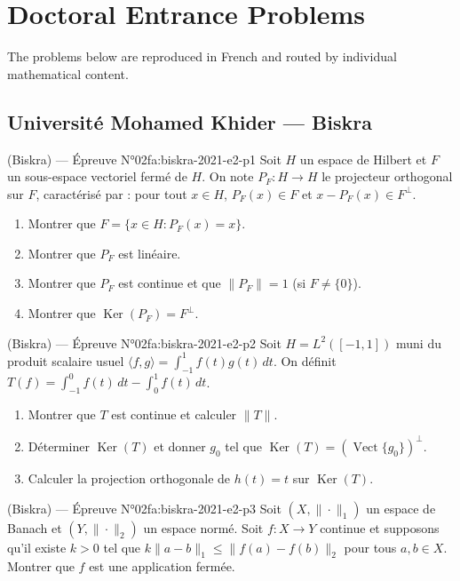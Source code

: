 \chapter{Doctoral Entrance Problems}
\label{ch:problems}

The problems below are reproduced in French and routed by individual mathematical content.
\newpage

\section{Université Mohamed Khider --- Biskra}
\begin{problem}{(Biskra) — Épreuve N°02}{fa:biskra-2021-e2-p1}
Soit $H$ un espace de Hilbert et $F$ un sous-espace vectoriel fermé de $H$. On note $P_F:H\to H$ le projecteur orthogonal sur $F$, caractérisé par : pour tout $x\in H$, $P_F(x)\in F$ et $x-P_F(x)\in F^\perp$.
\begin{enumerate}\item Montrer que $F=\{x\in H : P_F(x)=x\}$.\item Montrer que $P_F$ est linéaire.\item Montrer que $P_F$ est continue et que $\|P_F\|=1$ (si $F\neq\{0\}$).\item Montrer que $\operatorname{Ker}(P_F)=F^\perp$.\end{enumerate}
\end{problem}
\newpage
\begin{problem}{(Biskra) — Épreuve N°02}{fa:biskra-2021-e2-p2}
Soit $H=L^2([-1,1])$ muni du produit scalaire usuel $\langle f,g\rangle=\int_{-1}^1 f(t)g(t)\,dt$. On définit $T(f)=\int_{-1}^0f(t)\,dt-\int_0^1f(t)\,dt$.
\begin{enumerate}\item Montrer que $T$ est continue et calculer $\|T\|$.\item Déterminer $\operatorname{Ker}(T)$ et donner $g_0$ tel que $\operatorname{Ker}(T)=(\operatorname{Vect}\{g_0\})^\perp$.\item Calculer la projection orthogonale de $h(t)=t$ sur $\operatorname{Ker}(T)$.\end{enumerate}
\end{problem}
\newpage
\begin{problem}{(Biskra) — Épreuve N°02}{fa:biskra-2021-e2-p3}
Soit $(X,\|\cdot\|_1)$ un espace de Banach et $(Y,\|\cdot\|_2)$ un espace normé. Soit $f:X\to Y$ continue et supposons qu'il existe $k>0$ tel que $k\|a-b\|_1\leq\|f(a)-f(b)\|_2$ pour tous $a,b\in X$. Montrer que $f$ est une application fermée.
\end{problem}
\newpage

